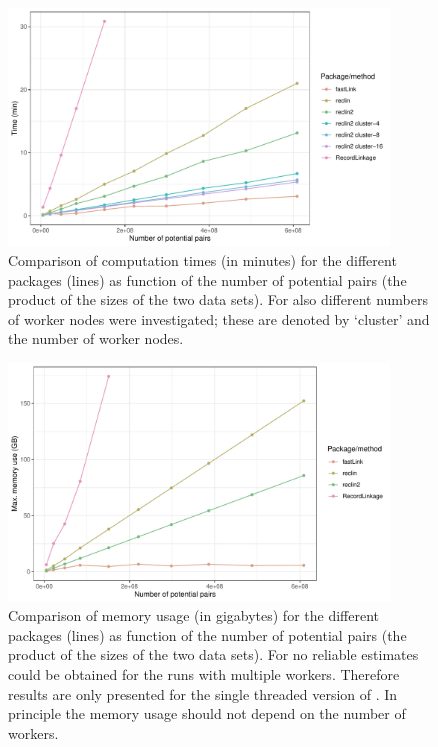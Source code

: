 \begin{figure}[p]
  \centering
  \includegraphics[width=0.9\textwidth]{benchmark_time}
  \caption{Comparison of computation times (in minutes) for the different packages (lines) as
  function of the number of potential pairs (the product of the sizes of the two data sets).  For
   also different numbers of worker nodes were investigated; these are denoted by
  `cluster' and the number of worker nodes. }
  \label{fig:benchtime}
\end{figure}

\begin{figure}[p]
  \centering
  \includegraphics[width=0.9\textwidth]{benchmark_memory}
  \caption{Comparison of memory usage (in gigabytes) for the different packages (lines) as function
  of the number of potential pairs (the product of the sizes of the two data sets).  For
   no reliable estimates could be obtained for the runs with multiple workers.
  Therefore results are only presented for the single threaded version of . In
  principle the memory usage should not depend on the number of workers.}
  \label{fig:benchmem}
\end{figure}

